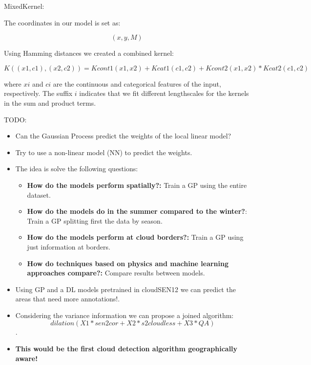 \documentclass{beamer}
\begin{document}
\begin{frame}[fragile]{MixedKernel:}

The coordinates in our model is set as:

$$(x, y , M)$$

Using Hamming distances we created a combined kernel:

$$
K((x1, c1), (x2, c2)) = Kcont1(x1, x2) + Kcat1(c1, c2) + Kcont2(x1, x2) * Kcat2(c1, c2)
$$

where $xi$ and $ci$ are the continuous and categorical features of the
input, respectively. The suffix $i$ indicates that we fit different
lengthscales for the kernels in the sum and product terms.

\end{frame}



\begin{frame}[fragile]{TODO:}
	\begin{itemize}[<+->]
		\item Can the Gaussian Process predict the weights of the local linear model?
		\item Try to use a non-linear model (NN) to predict the weights.
		\item The idea is solve the following questions:
			\begin{itemize}
				\item \textbf{How do the models perform spatially?:} Train a GP using the entire dataset.
				\item \textbf{How do the models do in the summer compared to the winter?}: Train a GP splitting first the data by season.
				\item \textbf{How do the models perform at cloud borders?:} Train a GP using just information at borders.
				\item \textbf{How do techniques based on physics and machine learning approaches compare?:} Compare results between models.
			\end{itemize}
		\item Using GP and a DL models pretrained in cloudSEN12 we can predict the areas that need more annotations!.
		\item Considering the variance information we can propose a joined algorithm: $$dilation(X1*sen2cor + X2*s2cloudless + X3*QA)$$.
		\item \textbf{This would be the first cloud detection algorithm geographically aware!}
	\end{itemize}
\end{frame}
\end{document}

